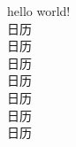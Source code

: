 \documentclass[11pt, a4paper]{awesome-cv}
\begin{document}
hello world! \\
\lishu 日历 \\

\songti 日历 \\
\heiti 日历 \\ 
\kaishu 日历 \\
\fangsong 日历 \\
\lishu 日历 \\
\youyuan 日历
\end{document}

